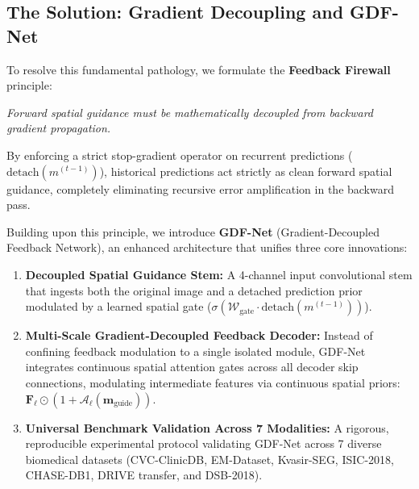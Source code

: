 \subsection{The Solution: Gradient Decoupling and GDF-Net}
To resolve this fundamental pathology, we formulate the \textbf{Feedback Firewall} principle:
\begin{center}
  \textit{Forward spatial guidance must be mathematically decoupled from backward gradient propagation.}
\end{center}
By enforcing a strict stop-gradient operator on recurrent predictions ($\text{detach}(m^{(t-1)})$), historical predictions act strictly as clean forward spatial guidance, completely eliminating recursive error amplification in the backward pass.

Building upon this principle, we introduce \textbf{GDF-Net} (Gradient-Decoupled Feedback Network), an enhanced architecture that unifies three core innovations:
\begin{enumerate}
  \item \textbf{Decoupled Spatial Guidance Stem:} A 4-channel input convolutional stem that ingests both the original image and a detached prediction prior modulated by a learned spatial gate ($\sigma(\mathcal{W}_{\text{gate}} \cdot \text{detach}(m^{(t-1)}))$).
  \item \textbf{Multi-Scale Gradient-Decoupled Feedback Decoder:} Instead of confining feedback modulation to a single isolated module, GDF-Net integrates continuous spatial attention gates across all decoder skip connections, modulating intermediate features via continuous spatial priors: $\mathbf{F}_\ell \odot (1 + \mathcal{A}_\ell(\mathbf{m}_{\text{guide}}))$.
  \item \textbf{Universal Benchmark Validation Across 7 Modalities:} A rigorous, reproducible experimental protocol validating GDF-Net across 7 diverse biomedical datasets (CVC-ClinicDB, EM-Dataset, Kvasir-SEG, ISIC-2018, CHASE-DB1, DRIVE transfer, and DSB-2018).
\end{enumerate}

